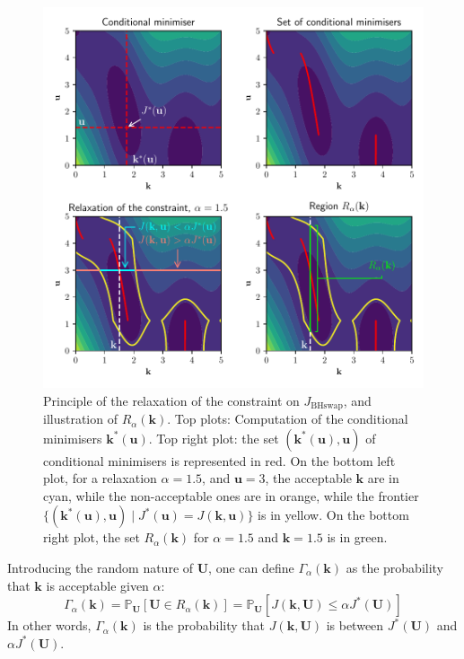 \documentclass[preprint, 1p]{elsarticle}
\newcommand{\Prob}{\mathbb{P}}
\begin{document}
\begin{figure}[!t]
\centering
\includegraphics[width=12cm]{Figures/relaxation_tuto.pdf}
\caption{Principle of the relaxation of the constraint on $J_{\mathrm{BHswap}}$, and illustration of $R_\alpha(\mathbf{k})$. Top plots: Computation of the conditional minimisers $\mathbf{k}^*(\mathbf{u})$. Top right plot: the set $(\mathbf{k}^*(\mathbf{u}),\mathbf{u})$ of conditional minimisers is represented in red. On the bottom left plot, for a relaxation $\alpha=1.5$, and $\mathbf{u}=3$, the acceptable $\mathbf{k}$ are in cyan, while the non-acceptable ones are in orange, while the frontier $\{(\mathbf{k}^*(\mathbf{u}),\mathbf{u}) \mid J^*(\mathbf{u}) = J(\mathbf{k},\mathbf{u})\}$ is in yellow. On the bottom right plot, the set $R_{\alpha}(\mathbf{k})$ for $\alpha=1.5$ and $\mathbf{k}=1.5$ is in green.}
\label{fig:relax_tuto}
\end{figure}

Introducing the random nature of $\mathbf{U}$, one can define $\Gamma_\alpha(\mathbf{k})$ as the probability that $\mathbf{k}$ is acceptable given $\alpha$:
\begin{equation}
  \label{eq:def_Gamma}
  \Gamma_\alpha(\mathbf{k}) = \Prob_{\mathbf{U}}\left[\mathbf{U} \in R_\alpha(\mathbf{k})\right] = \Prob_{\mathbf{U}}\left[J(\mathbf{k},\mathbf{U}) \leq 
    \alpha J^*(\mathbf{U}) \right]
\end{equation}
In other words, $\Gamma_{\alpha}(\mathbf{k})$ is the probability that $J(\mathbf{k},\mathbf{U})$ is between 
$J^*(\mathbf{U})$ and 
$\alpha J^*(\mathbf{U})$.
\end{document}
